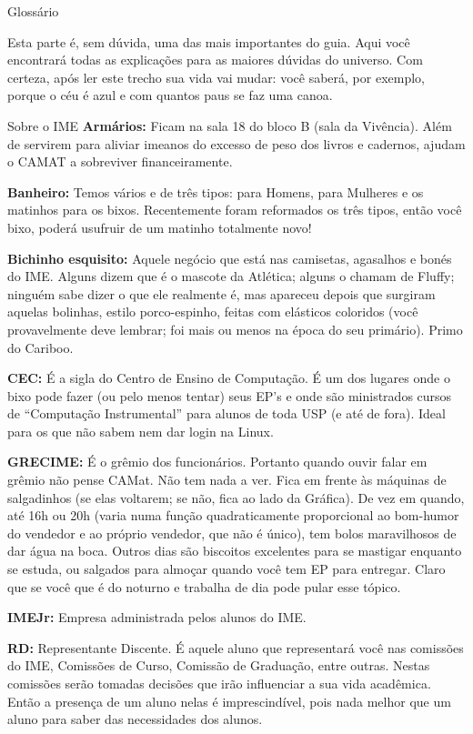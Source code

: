 \begin{secao}{Glossário}

Esta parte é, sem dúvida, uma das mais importantes do guia. Aqui você
encontrará todas as explicações para as maiores dúvidas do universo. Com
certeza, após ler este trecho sua vida vai mudar: você saberá, por exemplo,
porque o céu é azul e com quantos paus se faz uma canoa.


\begin{subsecao}{Sobre o IME}
{\bf Armários:} Ficam
na sala 18 do bloco B (sala da Vivência). Além de servirem para
aliviar imeanos do excesso de peso dos livros e cadernos, ajudam o CAMAT a
sobreviver financeiramente.

{\bf Banheiro:} Temos vários e de três tipos: para Homens, para Mulheres e os matinhos para os bixos. Recentemente foram reformados os três tipos, então você bixo, poderá usufruir de um matinho totalmente novo! 

{\bf Bichinho esquisito:} Aquele negócio que está nas camisetas, agasalhos e bonés do IME. Alguns dizem que é o mascote da Atlética; alguns o chamam de Fluffy; ninguém sabe dizer o que ele realmente é, mas apareceu depois que surgiram aquelas bolinhas, estilo porco-espinho, feitas com elásticos coloridos (você provavelmente deve lembrar; foi mais ou menos na época do seu primário). Primo do Cariboo.

{\bf CEC:} É a sigla do Centro de Ensino de Computação. É um dos lugares onde o bixo pode fazer (ou pelo menos tentar) seus EP's e onde são ministrados cursos de
``Computação Instrumental'' para alunos de toda USP (e até de fora).
 Ideal para os que não sabem nem dar login na Linux.

{\bf GRECIME:} É o grêmio dos funcionários. Portanto quando ouvir falar em grêmio não pense CAMat. Não tem nada a ver. Fica em frente às máquinas de salgadinhos (se elas voltarem; se não, fica ao lado da Gráfica). De vez em quando, até 16h ou 20h (varia numa função quadraticamente proporcional ao bom-humor do vendedor e ao próprio vendedor, que não é único), tem bolos maravilhosos de dar água na boca. Outros dias são biscoitos excelentes para se mastigar enquanto se estuda, ou salgados para almoçar quando você tem EP para entregar. Claro que se você que é do noturno e trabalha de dia pode pular esse tópico. 

{\bf IMEJr:} Empresa administrada pelos alunos do IME.

{\bf RD:} Representante Discente. É aquele aluno que representará você nas comissões do IME, Comissões de Curso, Comissão de Graduação, entre outras. Nestas comissões serão tomadas decisões que irão influenciar a sua vida acadêmica. Então a presença de um aluno nelas é imprescindível, pois nada melhor que um aluno para saber das necessidades dos alunos.


\end{subsecao}
\end{secao}
